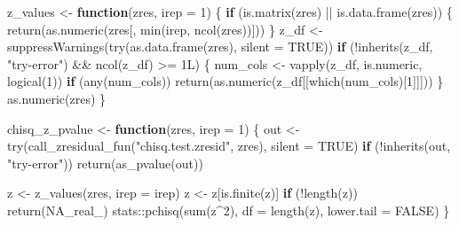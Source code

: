 \documentclass[
  english,
  letterpaper,
  DIV=11,
  numbers=noendperiod]{scrartcl}
\newenvironment{Shaded}{\begin{snugshade}}{\end{snugshade}}
\newcommand{\AttributeTok}[1]{\textcolor[rgb]{0.40,0.45,0.13}{#1}}
\newcommand{\ConstantTok}[1]{\textcolor[rgb]{0.56,0.35,0.01}{#1}}
\newcommand{\ControlFlowTok}[1]{\textcolor[rgb]{0.00,0.23,0.31}{\textbf{#1}}}
\newcommand{\DecValTok}[1]{\textcolor[rgb]{0.68,0.00,0.00}{#1}}
\newcommand{\FunctionTok}[1]{\textcolor[rgb]{0.28,0.35,0.67}{#1}}
\newcommand{\NormalTok}[1]{\textcolor[rgb]{0.00,0.23,0.31}{#1}}
\newcommand{\OtherTok}[1]{\textcolor[rgb]{0.00,0.23,0.31}{#1}}
\newcommand{\SpecialCharTok}[1]{\textcolor[rgb]{0.37,0.37,0.37}{#1}}
\newcommand{\StringTok}[1]{\textcolor[rgb]{0.13,0.47,0.30}{#1}}
\begin{document}
\begin{Shaded}
\begin{Highlighting}[]
\NormalTok{z\_values }\OtherTok{\textless{}{-}} \ControlFlowTok{function}\NormalTok{(zres, }\AttributeTok{irep =} \DecValTok{1}\NormalTok{) \{}
  \ControlFlowTok{if}\NormalTok{ (}\FunctionTok{is.matrix}\NormalTok{(zres) }\SpecialCharTok{||} \FunctionTok{is.data.frame}\NormalTok{(zres)) \{}
    \FunctionTok{return}\NormalTok{(}\FunctionTok{as.numeric}\NormalTok{(zres[, }\FunctionTok{min}\NormalTok{(irep, }\FunctionTok{ncol}\NormalTok{(zres))]))}
\NormalTok{  \}}
\NormalTok{  z\_df }\OtherTok{\textless{}{-}} \FunctionTok{suppressWarnings}\NormalTok{(}\FunctionTok{try}\NormalTok{(}\FunctionTok{as.data.frame}\NormalTok{(zres), }\AttributeTok{silent =} \ConstantTok{TRUE}\NormalTok{))}
  \ControlFlowTok{if}\NormalTok{ (}\SpecialCharTok{!}\FunctionTok{inherits}\NormalTok{(z\_df, }\StringTok{"try{-}error"}\NormalTok{) }\SpecialCharTok{\&\&} \FunctionTok{ncol}\NormalTok{(z\_df) }\SpecialCharTok{\textgreater{}=} \DecValTok{1}\NormalTok{L) \{}
\NormalTok{    num\_cols }\OtherTok{\textless{}{-}} \FunctionTok{vapply}\NormalTok{(z\_df, is.numeric, }\FunctionTok{logical}\NormalTok{(}\DecValTok{1}\NormalTok{))}
    \ControlFlowTok{if}\NormalTok{ (}\FunctionTok{any}\NormalTok{(num\_cols)) }\FunctionTok{return}\NormalTok{(}\FunctionTok{as.numeric}\NormalTok{(z\_df[[}\FunctionTok{which}\NormalTok{(num\_cols)[}\DecValTok{1}\NormalTok{]]]))}
\NormalTok{  \}}
  \FunctionTok{as.numeric}\NormalTok{(zres)}
\NormalTok{\}}

\NormalTok{chisq\_z\_pvalue }\OtherTok{\textless{}{-}} \ControlFlowTok{function}\NormalTok{(zres, }\AttributeTok{irep =} \DecValTok{1}\NormalTok{) \{}
\NormalTok{  out }\OtherTok{\textless{}{-}} \FunctionTok{try}\NormalTok{(}\FunctionTok{call\_zresidual\_fun}\NormalTok{(}\StringTok{"chisq.test.zresid"}\NormalTok{, zres), }\AttributeTok{silent =} \ConstantTok{TRUE}\NormalTok{)}
  \ControlFlowTok{if}\NormalTok{ (}\SpecialCharTok{!}\FunctionTok{inherits}\NormalTok{(out, }\StringTok{"try{-}error"}\NormalTok{)) }\FunctionTok{return}\NormalTok{(}\FunctionTok{as\_pvalue}\NormalTok{(out))}

\NormalTok{  z }\OtherTok{\textless{}{-}} \FunctionTok{z\_values}\NormalTok{(zres, }\AttributeTok{irep =}\NormalTok{ irep)}
\NormalTok{  z }\OtherTok{\textless{}{-}}\NormalTok{ z[}\FunctionTok{is.finite}\NormalTok{(z)]}
  \ControlFlowTok{if}\NormalTok{ (}\SpecialCharTok{!}\FunctionTok{length}\NormalTok{(z)) }\FunctionTok{return}\NormalTok{(}\ConstantTok{NA\_real\_}\NormalTok{)}
\NormalTok{  stats}\SpecialCharTok{::}\FunctionTok{pchisq}\NormalTok{(}\FunctionTok{sum}\NormalTok{(z}\SpecialCharTok{\^{}}\DecValTok{2}\NormalTok{), }\AttributeTok{df =} \FunctionTok{length}\NormalTok{(z), }\AttributeTok{lower.tail =} \ConstantTok{FALSE}\NormalTok{)}
\NormalTok{\}}


\end{Highlighting}
\end{Shaded}
\end{document}
